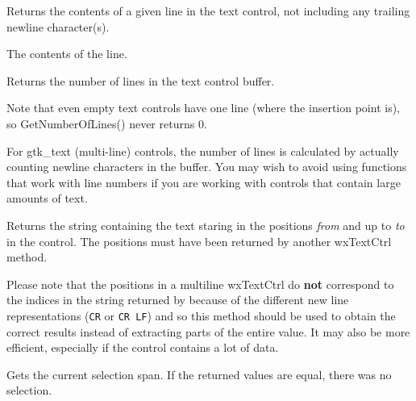 
Returns the contents of a given line in the text control, not including
any trailing newline character(s).




The contents of the line.


\label{wxtextctrlgetnumberoflines}


Returns the number of lines in the text control buffer.


Note that even empty text controls have one line (where the insertion point
is), so GetNumberOfLines() never returns 0.

For gtk\_text (multi-line) controls, the number of lines is
calculated by actually counting newline characters in the buffer. You
may wish to avoid using functions that work with line numbers if you are
working with controls that contain large amounts of text.


\label{wxtextctrlgetrange}


Returns the string containing the text staring in the positions {\it from} and
up to {\it to} in the control. The positions must have been returned by another
wxTextCtrl method.

Please note that the positions in a multiline wxTextCtrl do {\bf not}
correspond to the indices in the string returned by 
 because of the different new line
representations ({\tt CR} or {\tt CR LF}) and so this method should be used to
obtain the correct results instead of extracting parts of the entire value. It
may also be more efficient, especially if the control contains a lot of data.


\label{wxtextctrlgetselection}


Gets the current selection span. If the returned values are equal, there was
no selection.


